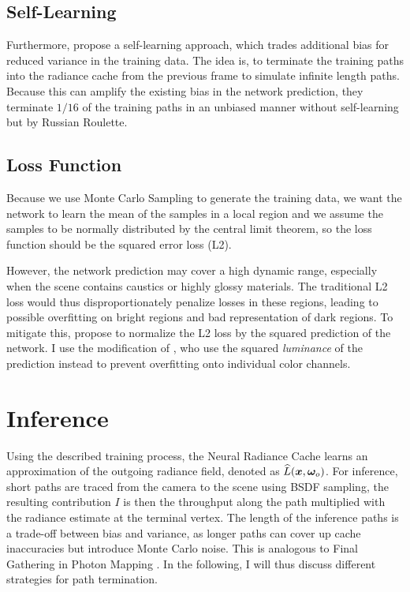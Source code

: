 \subsection{Self-Learning}
Furthermore, \textcite{muller2021} propose a self-learning approach, which trades additional bias for reduced variance in the training data.
The idea is, to terminate the training paths into the radiance cache from the previous frame to simulate infinite length paths.
Because this can amplify the existing bias in the network prediction, they terminate $1/16$ of the training paths in an unbiased manner without self-learning but by Russian Roulette.

\subsection{Loss Function}
Because we use Monte Carlo Sampling to generate the training data, we want the network to learn the mean of the samples in a local region and we assume the samples to be normally distributed by the central limit theorem, so the loss function should be the squared error loss (L2).

However, the network prediction may cover a high dynamic range, especially when the scene contains caustics or highly glossy materials.
The traditional L2 loss would thus disproportionately penalize losses in these regions, leading to possible overfitting on bright regions and bad representation of dark regions.
To mitigate this, \textcite{lehtinen2018} propose to normalize the L2 loss by the squared prediction of the network.
I use the modification of \textcite{muller2021}, who use the squared \emph{luminance} of the prediction instead to prevent overfitting onto individual color channels.

\section{Inference}
Using the described training process, the Neural Radiance Cache learns an approximation of the outgoing radiance field, denoted as $\widehat{L}(\bm{x}, {\bm{\omega}_o})$.
For inference, short paths are traced from the camera to the scene using BSDF sampling, the resulting contribution $I$ is then the throughput along the path multiplied with the radiance estimate at the terminal vertex.
The length of the inference paths is a trade-off between bias and variance, as longer paths can cover up cache inaccuracies but introduce Monte Carlo noise.
This is analogous to Final Gathering in Photon Mapping \parencite{jensen1996}.
In the following, I will thus discuss different strategies for path termination.

